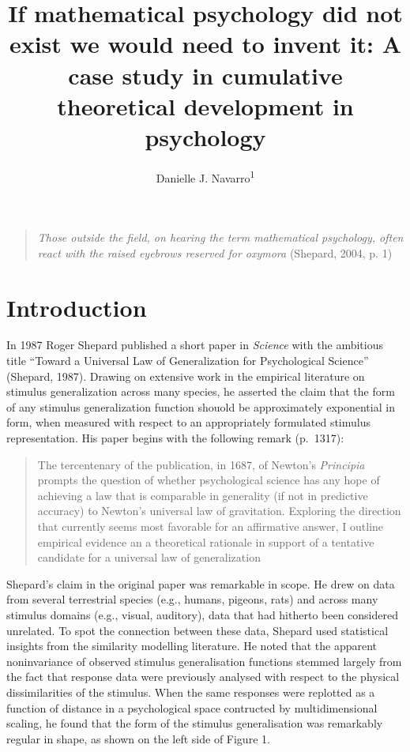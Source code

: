 \documentclass[english,doc]{apa6}
\author{Danielle J. Navarro\textsuperscript{1}}
\affiliation{
\vspace{0.5cm}
\textsuperscript{1} School of Psychology, University of New South Wales}
\title{If mathematical psychology did not exist we would need to invent it: A case study in cumulative theoretical development in psychology}
\date{}
\begin{document}
\maketitle

\newpage

\begin{quote}
\emph{Those outside the field, on hearing the term mathematical psychology, often react with the raised eyebrows reserved for oxymora} (Shepard, 2004, p. 1)
\end{quote}

\vspace*{12pt}

\hypertarget{introduction}{%
\section{Introduction}\label{introduction}}

In 1987 Roger Shepard published a short paper in \emph{Science} with the ambitious title \enquote{Toward a Universal Law of Generalization for Psychological Science} (Shepard, 1987). Drawing on extensive work in the empirical literature on stimulus generalization across many species, he asserted the claim that the form of any stimulus generalization function shouold be approximately exponential in form, when measured with respect to an appropriately formulated stimulus representation. His paper begins with the following remark (p.~1317):

\begin{quote}
The tercentenary of the publication, in 1687, of Newton's \emph{Principia} prompts the question of whether psychological science has any hope of achieving a law that is comparable in generality (if not in predictive accuracy) to Newton's universal law of gravitation. Exploring the direction that currently seems most favorable for an affirmative answer, I outline empirical evidence an a theoretical rationale in support of a tentative candidate for a universal law of generalization
\end{quote}

\noindent
Shepard's claim in the original paper was remarkable in scope. He drew on data from several terrestrial species (e.g., humans, pigeons, rats) and across many stimulus domains (e.g., visual, auditory), data that had hitherto been considered unrelated. To spot the connection between these data, Shepard used statistical insights from the similarity modelling literature. He noted that the apparent noninvariance of observed stimulus generalisation functions stemmed largely from the fact that response data were previously analysed with respect to the physical dissimilarities of the stimulus. When the same responses were replotted as a function of distance in a psychological space contructed by multidimensional scaling, he found that the form of the stimulus generalisation was remarkably regular in shape, as shown on the left side of Figure 1.
\end{document}
